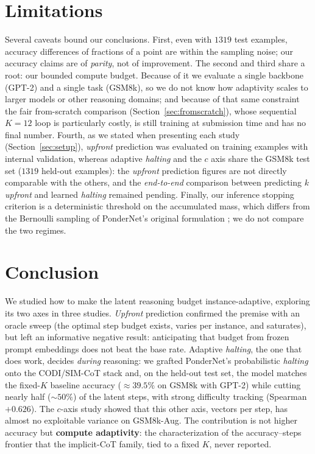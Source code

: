 \documentclass[11pt]{article}
\begin{document}
\section*{Limitations}

Several caveats bound our conclusions. First, even with $1319$ test examples, accuracy differences of fractions of a point are within the sampling noise; our accuracy claims are of \emph{parity}, not of improvement. The second and third share a root: our bounded compute budget. Because of it we evaluate a single backbone (GPT-2) and a single task (GSM8k), so we do not know how adaptivity scales to larger models or other reasoning domains; and because of that same constraint the fair from-scratch comparison (Section~\ref{sec:fromscratch}), whose sequential $K{=}12$ loop is particularly costly, is still training at submission time and has no final number. Fourth, as we stated when presenting each study (Section~\ref{sec:setup}), \textit{upfront} prediction was evaluated on training examples with internal validation, whereas adaptive \textit{halting} and the $c$ axis share the GSM8k test set ($1319$ held-out examples): the \textit{upfront} prediction figures are not directly comparable with the others, and the \textit{end-to-end} comparison between predicting $k$ \textit{upfront} and learned \textit{halting} remained pending. Finally, our inference stopping criterion is a deterministic threshold on the accumulated mass, which differs from the Bernoulli sampling of PonderNet's original formulation \citep{banino2021pondernet}; we do not compare the two regimes.

\section{Conclusion}

We studied how to make the latent reasoning budget instance-adaptive, exploring its two axes in three studies. \textit{Upfront} prediction confirmed the premise with an oracle sweep (the optimal step budget exists, varies per instance, and saturates), but left an informative negative result: anticipating that budget from frozen prompt embeddings does not beat the base rate. Adaptive \textit{halting}, the one that does work, decides \emph{during} reasoning: we grafted PonderNet's probabilistic \textit{halting} onto the CODI/SIM-CoT stack and, on the held-out test set, the model matches the fixed-$K$ baseline accuracy ($\approx 39.5\%$ on GSM8k with GPT-2) while cutting nearly half ($\sim 50\%$) of the latent steps, with strong difficulty tracking (Spearman $+0.626$). The $c$-axis study showed that this other axis, vectors per step, has almost no exploitable variance on GSM8k-Aug. The contribution is not higher accuracy but \textbf{compute adaptivity}: the characterization of the accuracy--steps frontier that the implicit-CoT family, tied to a fixed $K$, never reported.


\end{document}
